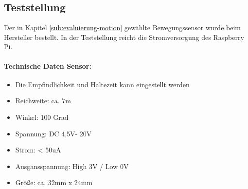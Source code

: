\subsection{Teststellung}
Der in Kapitel \ref{sub:evaluierung-motion} gewählte Bewegungssensor wurde beim Hersteller bestellt. In der Teststellung reicht die Stromversorgung des Raspberry Pi. 
\paragraph{Technische Daten Sensor:}
\begin{itemize}
\item Die Empfindlichkeit und Haltezeit kann eingestellt werden
\item Reichweite: ca. 7m
\item Winkel: 100 Grad
\item Spannung: DC 4,5V- 20V
\item Strom: < 50uA
\item Ausgansspannung: High 3V / Low 0V
\item Größe: ca. 32mm x 24mm
\end{itemize}

